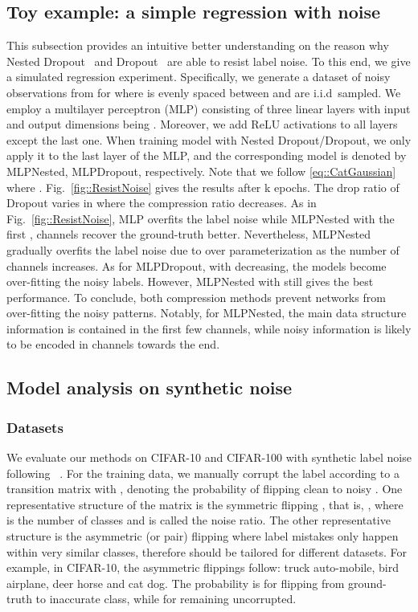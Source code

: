 \documentclass[journal]{IEEEtran}
\begin{document}
\subsection{Toy example: a simple regression with noise}
\label{sec:toy}
This subsection provides an intuitive better understanding on the reason why Nested Dropout~\cite{rippel2014learning} and Dropout~\cite{srivastava2014dropout} are able to resist label noise.
To this end, we give a simulated regression experiment. 
Specifically, we generate a dataset of noisy observations from  for  where  is evenly spaced between  and  are i.i.d~sampled. 
We employ a multilayer perceptron (MLP) consisting of three linear layers with input and output dimensions being .
Moreover, we add ReLU activations to all layers except the last one.
When training model with Nested Dropout/Dropout, we only apply it to the last layer of the MLP, and the corresponding model is denoted by MLPNested, MLPDropout, respectively. 
Note that we follow \eqref{eq::CatGaussian} where .
Fig.~\ref{fig::ResistNoise} gives the results after k epochs.
The drop ratio  of Dropout varies in  where the compression ratio decreases. 
As in Fig.~\ref{fig::ResistNoise}, MLP overfits the label noise while MLPNested with the first ,  channels recover the ground-truth  better. 
Nevertheless, MLPNested gradually overfits the label noise due to over parameterization as the number of channels increases.
As for MLPDropout, with  decreasing, the models become over-fitting the noisy labels.
However, MLPNested with  still gives the best performance.
To conclude, both compression methods prevent networks from over-fitting the noisy patterns. 
Notably, for MLPNested, the main data structure information is contained in the first few channels, while noisy information is likely to be encoded in channels towards the end.


\subsection{Model analysis on synthetic noise} 
\label{subsec::synthetic}

\subsubsection{Datasets}
We evaluate our methods on CIFAR-10 \cite{krizhevsky2009learning} and CIFAR-100 \cite{krizhevsky2009learning} with synthetic label noise following ~\cite{tanaka2018joint,li2020dividemix,li2019learning}.
For the training data, we manually corrupt the label according to a transition matrix  with
,  denoting the probability of flipping clean  to noisy .
One representative structure of the matrix  is the symmetric flipping \cite{van2015learning}, that is, ,  where  is the number of classes and  is called the noise ratio.
The other representative structure is the asymmetric (or pair) flipping \cite{patrini2017making} where label mistakes only happen within very similar classes, therefore should be tailored for different datasets. For example, in CIFAR-10, the asymmetric flippings follow: truck  auto-mobile, bird  airplane, deer  horse and cat  dog. The probability is  for flipping from ground-truth to inaccurate class, while  for remaining uncorrupted. 
\end{document}

